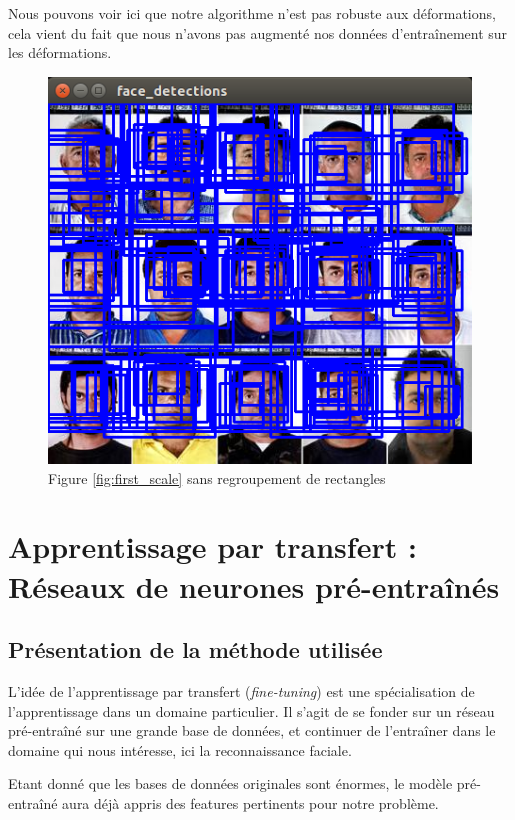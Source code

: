 \documentclass[a4paper,11pt]{article}
\begin{document}
	Nous pouvons voir ici que notre algorithme n'est pas robuste aux déformations, cela vient du
	fait que nous n'avons pas augmenté nos données d'entraînement sur les déformations.


	\begin{figure}[H]
	    \centering
	    \includegraphics[scale=0.3]{without_filter.png}
	    \caption{Figure \ref{fig:first_scale} sans regroupement de rectangles}
	    \label{fig:without_filter}
	\end{figure}


\section{Apprentissage par transfert : Réseaux de neurones pré-entraînés}
\subsection{Présentation de la méthode utilisée}
\label{sec:transfert_learning}

L'idée de l'apprentissage par transfert (\textit{fine-tuning}) est une spécialisation de
l'apprentissage dans un domaine particulier. Il s'agit de se fonder sur un réseau pré-entraîné sur
une grande base de données, et continuer de l'entraîner dans le domaine qui nous intéresse, ici la reconnaissance faciale.

Etant donné que les bases de données originales sont énormes, le modèle pré-entraîné aura déjà appris des features pertinents pour notre problème.
\end{document}
